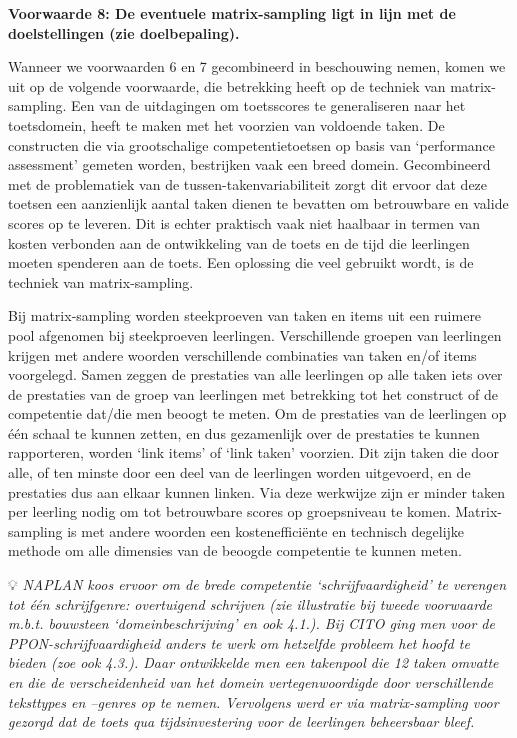 \documentclass[
  letterpaper,
]{report}
\begin{document}
\textbf{Voorwaarde 8: De eventuele matrix-sampling ligt in lijn met de
doelstellingen (zie doelbepaling).}

Wanneer we voorwaarden 6 en 7 gecombineerd in beschouwing nemen, komen
we uit op de volgende voorwaarde, die betrekking heeft op de techniek
van matrix-sampling. Een van de uitdagingen om toetsscores te
generaliseren naar het toetsdomein, heeft te maken met het voorzien van
voldoende taken. De constructen die via grootschalige competentietoetsen
op basis van `performance assessment' gemeten worden, bestrijken vaak
een breed domein. Gecombineerd met de problematiek van de
tussen-takenvariabiliteit zorgt dit ervoor dat deze toetsen een
aanzienlijk aantal taken dienen te bevatten om betrouwbare en valide
scores op te leveren. Dit is echter praktisch vaak niet haalbaar in
termen van kosten verbonden aan de ontwikkeling van de toets en de tijd
die leerlingen moeten spenderen aan de toets. Een oplossing die veel
gebruikt wordt, is de techniek van matrix-sampling.

Bij matrix-sampling worden steekproeven van taken en items uit een
ruimere pool afgenomen bij steekproeven leerlingen. Verschillende
groepen van leerlingen krijgen met andere woorden verschillende
combinaties van taken en/of items voorgelegd. Samen zeggen de prestaties
van alle leerlingen op alle taken iets over de prestaties van de groep
van leerlingen met betrekking tot het construct of de competentie
dat/die men beoogt te meten. Om de prestaties van de leerlingen op één
schaal te kunnen zetten, en dus gezamenlijk over de prestaties te kunnen
rapporteren, worden `link items' of `link taken' voorzien. Dit zijn
taken die door alle, of ten minste door een deel van de leerlingen
worden uitgevoerd, en de prestaties dus aan elkaar kunnen linken. Via
deze werkwijze zijn er minder taken per leerling nodig om tot
betrouwbare scores op groepsniveau te komen. Matrix-sampling is met
andere woorden een kostenefficiënte en technisch degelijke methode om
alle dimensies van de beoogde competentie te kunnen meten.

💡 \emph{NAPLAN koos ervoor om de brede competentie `schrijfvaardigheid'
te verengen tot één schrijfgenre: overtuigend schrijven (zie illustratie
bij tweede voorwaarde m.b.t. bouwsteen `domeinbeschrijving' en ook
4.1.). Bij CITO ging men voor de PPON-schrijfvaardigheid anders te werk
om hetzelfde probleem het hoofd te bieden (zoe ook 4.3.). Daar
ontwikkelde men een takenpool die 12 taken omvatte en die de
verscheidenheid van het domein vertegenwoordigde door verschillende
teksttypes en --genres op te nemen. Vervolgens werd er via
matrix-sampling voor gezorgd dat de toets qua tijdsinvestering voor de
leerlingen beheersbaar bleef.}
\end{document}
